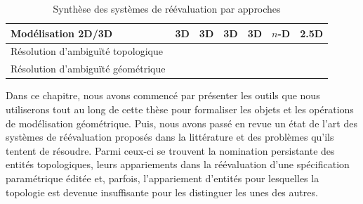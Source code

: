 \begin{table}
\begin{tabularx}{\textwidth}{|p{4.55cm}||Y|Y|Y|Y|Y|Y|}
		\hline
		Modélisation 2D/3D                                                                   & 3D                      & 3D                      & 3D                      & 3D                      & \(n\)-D                                                             & 2.5D                                                    \\
		\hline
		Résolution  d'ambiguïté topologique                                                  & \cmark                  & \cmark                  & \cmark                  & \cmark                  & \cmark                                                              & \cmark                                                  \\
		\hline %
		Résolution  d'ambiguïté géométrique                                                  & \cmark                  & \cmark                  & \cmark                  & \cmark                  & \xmark                                                              & \cmark                                                  \\
		\hline %
	\end{tabularx}
 	\caption{Synthèse des systèmes de réévaluation par approches}
	\label{tab:etat-art-modelisation-parametrique-synthes-systemes-approches}
\end{table}

Dans ce chapitre, nous avons commencé par présenter les outils que nous
utiliserons tout au long de cette thèse pour formaliser les objets et les
opérations de modélisation géométrique. Puis, nous avons passé en revue un état
de l'art des systèmes de réévaluation proposés dans la littérature et des
problèmes qu'ils tentent de résoudre. Parmi ceux-ci se trouvent la nomination
persistante des entités topologiques, leurs appariements dans la réévaluation
d'une spécification paramétrique éditée et, parfois, l'appariement d'entités pour
lesquelles la topologie est devenue insuffisante pour les distinguer les unes
des autres. %

